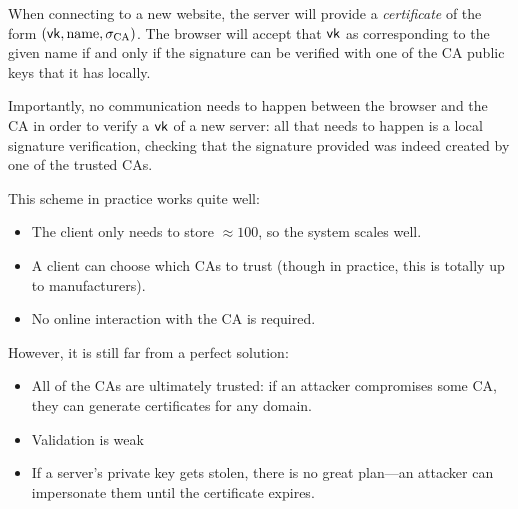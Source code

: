 When connecting to a new website, the server will provide a \emph{certificate} of the form $(\mathsf{vk}, \text{name}, \sigma_{\text{CA}})$. The browser will accept that $\mathsf{vk}$ as corresponding to the given name if and only if the signature can be verified with one of the CA public keys that it has locally.

Importantly, no communication needs to happen between the browser and the CA in order to verify a $\mathsf{vk}$ of a new server: all that needs to happen is a local signature verification, checking that the signature provided was indeed created by one of the trusted CAs.


This scheme in practice works quite well:
\begin{itemize}[noitemsep]
	\item The client only needs to store $\approx 100$, so the system scales well.
	\item A client can choose which CAs to trust (though in practice, this is totally up to manufacturers).
	\item No online interaction with the CA is required.
\end{itemize}

However, it is still far from a perfect solution:
\begin{itemize}[noitemsep]
	\item All of the CAs are ultimately trusted: if an attacker compromises some CA, they can generate certificates for any domain.
	\item Validation is weak
	\item If a server's private key gets stolen, there is no great plan---an attacker can impersonate them until the certificate expires.
\end{itemize}

